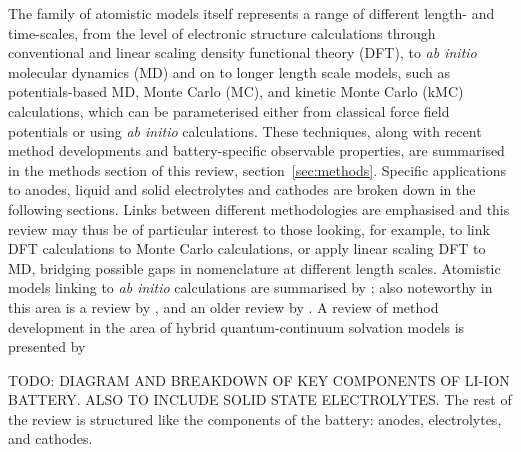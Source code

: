 \documentclass[../main.tex]{subfiles}
\begin{document}
The family of atomistic models itself represents a range of different length- and time-scales, from the level of electronic structure calculations through conventional and linear scaling density functional theory (DFT), to \textit{ab initio} molecular dynamics (MD) and on to longer length scale models, such as potentials-based MD, Monte Carlo (MC), and kinetic Monte Carlo (kMC) calculations, which can be parameterised either from classical force field potentials or using \textit{ab initio} calculations. These techniques, along with recent method developments and battery-specific observable properties, are summarised in the methods section of this review, section~\ref{sec:methods}. Specific applications to anodes, liquid and solid electrolytes and cathodes are broken down in the following sections. Links between different methodologies are emphasised and this review may thus be of particular interest to those looking, for example, to link DFT calculations to Monte Carlo calculations, or apply linear scaling DFT to MD, bridging possible gaps in nomenclature at different length scales. Atomistic models linking to \textit{ab initio} calculations are summarised by \citeauthor{VanderVen2020} \cite{VanderVen2020}; also noteworthy in this area is a review by \citeauthor{Shi_2016},\cite{Shi_2016} and an older review by \citeauthor{franco2013multiscale}.\cite{franco2013multiscale} A review of method development in the area of hybrid quantum-continuum solvation models is presented by \citeauthor{Tomasi2005}\cite{Tomasi2005} %

TODO: DIAGRAM AND BREAKDOWN OF KEY COMPONENTS OF LI-ION BATTERY. ALSO TO INCLUDE SOLID STATE ELECTROLYTES. The rest of the review is structured like the components of the battery: anodes, electrolytes, and cathodes.
\end{document}

